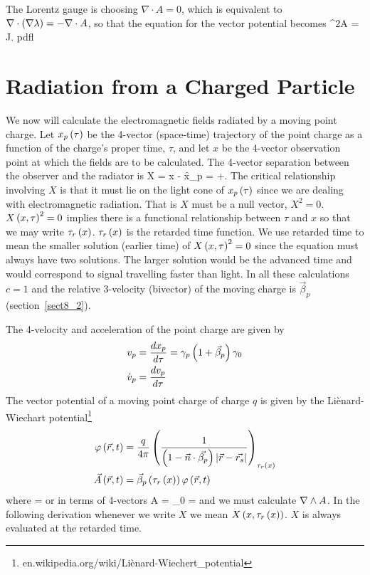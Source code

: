 The Lorentz gauge is choosing $\nabla\cdot A= 0$, which is equivalent to $\nabla\cdot\left ( {\nabla\lambda} \right ) = -\nabla\cdot A$, so that the equation for the vector potential becomes
\be
	\nabla^{2}A = J.
\ee  
pdfl\section{Radiation from a Charged Particle}
We now will calculate the electromagnetic fields radiated by a moving point charge.  Let ${x_{p}}\left ( {\tau} \right )$ be the 4-vector (space-time) trajectory of the point
charge as a function of the charge's proper time, $\tau$, and let $x$ be the 4-vector observation point at which the fields are to be calculated.  The 4-vector
separation between the observer and the radiator is
\be
	X = x - \f{x_{p}}{\tau} = +.
\ee
The critical relationship involving $X$ is that it must lie on the light cone of ${x_{p}}\left ( {\tau} \right )$ since we are dealing with electromagnetic radiation.  That is
$X$ must be a null vector, $X^{2}=0$.  ${X}\left ( {x,\tau} \right )^{2}=0$ implies there is a functional relationship between $\tau$ and $x$ so that we may write ${\tau_{r}}\left ( {x} \right )$.  
${\tau_{r}}\left ( {x} \right )$ is the retarded time function.  We use retarded time to mean the smaller solution (earlier time) of ${X}\left ( {x,\tau} \right )^{2}=0$ since the equation must always have two solutions. The larger solution would be the advanced time and would correspond to signal travelling faster than light.  In all these calculations $c=1$ and the relative 3-velocity (bivector) of the moving charge is $\vec{\beta}_{p}$
(section~\ref{sect8_2}).

The 4-velocity and acceleration of the point charge are given by
\begin{align}
	v_{p} &= \displaystyle\frac{d{x_{p}}}{d{\tau}} = \gamma_{p}\left ( {1+\vec{\beta}_{p}} \right )\gamma_{0}\\
	\dot{v}_{p} &= \displaystyle\frac{d{v_{p}}}{d{\tau}}
\end{align}
The vector potential of a moving point charge of charge $q$ is given by the Li\`{e}nard-Wiechart potential\footnote{en.wikipedia.org/wiki/Li\`{e}nard-Wiechert\_potential}
\begin{align}
	{\varphi}\left ( {\vec{r},t} \right ) &= \displaystyle\frac{q}{4\pi}\left ( {\displaystyle\frac{1}{\left ( {1-\vec{n}\cdot\vec{\beta_{p}}} \right )\left | {\vec{r}-\vec{r_{s}}} \right |}} \right )_{{\tau_{r}}\left ( {x} \right )} \\
	{\vec{A}}\left ( {\vec{r},t} \right ) &= {\vec{\beta}_{p}}\left ( {{\tau_{r}}\left ( {x} \right )} \right ){\varphi}\left ( {\vec{r},t} \right )
\end{align}
where
\be
	 =  
\ee
or in terms of 4-vectors
\be
	A = \gamma_{0} = 
\ee
and we must calculate $\nabla\wedge A$. In the following derivation whenever we write $X$ we mean ${X}\left ( {x,{\tau_{r}}\left ( {x} \right )} \right )$.  $X$ is always evaluated
at the retarded time.

